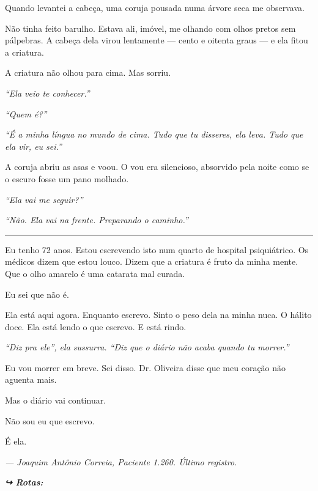 \noindent Quando levantei a cabeça, uma coruja pousada numa árvore seca me observava.

\noindent Não tinha feito barulho. Estava ali, imóvel, me olhando com olhos pretos sem pálpebras. A cabeça dela virou lentamente --- cento e oitenta graus --- e ela fitou a criatura.

\noindent A criatura não olhou para cima. Mas sorriu.

\noindent \textit{\textquotedblleft{}Ela veio te conhecer.\textquotedblright{}}

\noindent \textit{\textquotedblleft{}Quem é?\textquotedblright{}}

\noindent \textit{\textquotedblleft{}É a minha língua no mundo de cima. Tudo que tu disseres, ela leva. Tudo que ela vir, eu sei.\textquotedblright{}}

\noindent A coruja abriu as asas e voou. O vou era silencioso, absorvido pela noite como se o escuro fosse um pano molhado.

\noindent \textit{\textquotedblleft{}Ela vai me seguir?\textquotedblright{}}

\noindent \textit{\textquotedblleft{}Não. Ela vai na frente. Preparando o caminho.\textquotedblright{}}

\vspace{0.5em}\noindent\rule{\textwidth}{0.5pt}\vspace{0.5em}

\noindent Eu tenho 72 anos. Estou escrevendo isto num quarto de hospital psiquiátrico. Os médicos dizem que estou louco. Dizem que a criatura é fruto da minha mente. Que o olho amarelo é uma catarata mal curada.

\noindent Eu sei que não é.

\noindent Ela está aqui agora. Enquanto escrevo. Sinto o peso dela na minha nuca. O hálito doce. Ela está lendo o que escrevo. E está rindo.

\noindent \textit{\textquotedblleft{}Diz pra ele\textquotedblright{}\textit{, ela sussurra. }\textquotedblleft{}Diz que o diário não acaba quando tu morrer.\textquotedblright{}}

\noindent Eu vou morrer em breve. Sei disso. Dr. Oliveira disse que meu coração não aguenta mais.

\noindent Mas o diário vai continuar.

\noindent Não sou eu que escrevo.

\noindent É ela.

\noindent \textit{--- Joaquim Antônio Correia, Paciente 1.260. Último registro.}

\vspace{0.5em}
\noindent\textit{\textbf{↪ Rotas:}  \rotasep {} \rotasep {}}